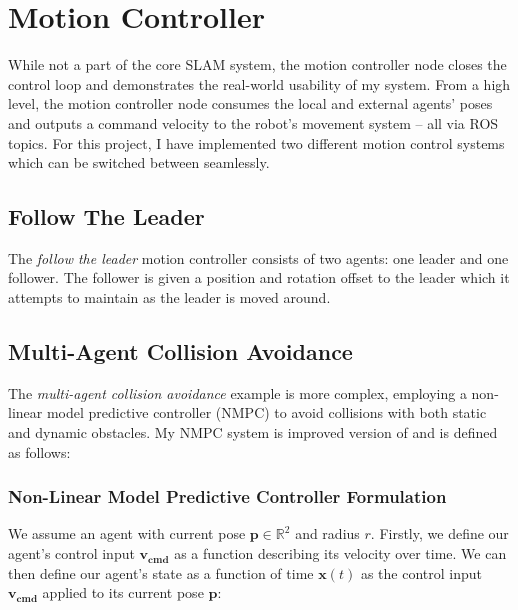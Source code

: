 \section{Motion Controller}
\label{sec:motion-controller}
While not a part of the core SLAM system, the motion controller node closes the control loop and demonstrates the real-world usability of my system. From a high level, the motion controller node consumes the local and external agents' poses and outputs a command velocity to the robot's movement system – all via ROS topics. For this project, I have implemented two different motion control systems which can be switched between seamlessly.

\subsection{Follow The Leader}
\label{sec:follow-the-leader}
The \textit{follow the leader} motion controller consists of two agents: one leader and one follower. The follower is given a position and rotation offset to the leader which it attempts to maintain as the leader is moved around.




\subsection{Multi-Agent Collision Avoidance}
\label{sec:multi-agent-collision-avoidance-implementation}
The \textit{multi-agent collision avoidance} example is more complex, employing a non-linear model predictive controller (NMPC) to avoid collisions with both static and dynamic obstacles. My NMPC system is improved version of \autocite{DBLP:journals/corr/KamelASN17} and is defined as follows:

\subsubsection{Non-Linear Model Predictive Controller Formulation}
\label{sec:nmpc-controller-formulation}
We assume an agent with current pose $\bm{p} \in \mathbb{R}^2$ and radius $r$. Firstly, we define our agent's control input $\bm{v_{cmd}}$ as a function describing its velocity over time. We can then define our agent's state as a function of time $\bm{x}(t)$ as the control input $\bm{v_{cmd}}$ applied to its current pose $\bm{p}$:

